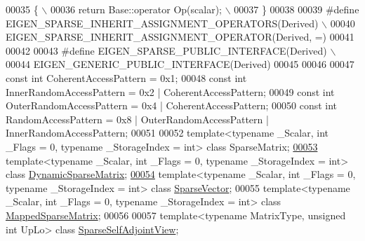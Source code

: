 \begin{DoxyCode}
00035 \textcolor{preprocessor}{\{ \(\backslash\)}
00036 \textcolor{preprocessor}{  return Base::operator Op(scalar); \(\backslash\)}
00037 \textcolor{preprocessor}{\}}
00038 
00039 \textcolor{preprocessor}{#define EIGEN\_SPARSE\_INHERIT\_ASSIGNMENT\_OPERATORS(Derived) \(\backslash\)}
00040 \textcolor{preprocessor}{EIGEN\_SPARSE\_INHERIT\_ASSIGNMENT\_OPERATOR(Derived, =)}
00041 
00042 
00043 \textcolor{preprocessor}{#define EIGEN\_SPARSE\_PUBLIC\_INTERFACE(Derived) \(\backslash\)}
00044 \textcolor{preprocessor}{  EIGEN\_GENERIC\_PUBLIC\_INTERFACE(Derived)}
00045 
00046   
00047 \textcolor{keyword}{const} \textcolor{keywordtype}{int} CoherentAccessPattern     = 0x1;
00048 \textcolor{keyword}{const} \textcolor{keywordtype}{int} InnerRandomAccessPattern  = 0x2 | CoherentAccessPattern;
00049 \textcolor{keyword}{const} \textcolor{keywordtype}{int} OuterRandomAccessPattern  = 0x4 | CoherentAccessPattern;
00050 \textcolor{keyword}{const} \textcolor{keywordtype}{int} RandomAccessPattern       = 0x8 | OuterRandomAccessPattern | InnerRandomAccessPattern;
00051 
00052 \textcolor{keyword}{template}<\textcolor{keyword}{typename} \_Scalar, \textcolor{keywordtype}{int} \_Flags = 0, \textcolor{keyword}{typename} \_StorageIndex = \textcolor{keywordtype}{int}>  \textcolor{keyword}{class }SparseMatrix;
\hyperlink{class_eigen_1_1_dynamic_sparse_matrix}{00053} \textcolor{keyword}{template}<\textcolor{keyword}{typename} \_Scalar, \textcolor{keywordtype}{int} \_Flags = 0, \textcolor{keyword}{typename} \_StorageIndex = \textcolor{keywordtype}{int}>  \textcolor{keyword}{class }
      \hyperlink{class_eigen_1_1_dynamic_sparse_matrix}{DynamicSparseMatrix};
\hyperlink{group___sparse_core___module}{00054} \textcolor{keyword}{template}<\textcolor{keyword}{typename} \_Scalar, \textcolor{keywordtype}{int} \_Flags = 0, \textcolor{keyword}{typename} \_StorageIndex = \textcolor{keywordtype}{int}>  \textcolor{keyword}{class }
      \hyperlink{group___sparse_core___module_class_eigen_1_1_sparse_vector}{SparseVector};
00055 \textcolor{keyword}{template}<\textcolor{keyword}{typename} \_Scalar, \textcolor{keywordtype}{int} \_Flags = 0, \textcolor{keyword}{typename} \_StorageIndex = \textcolor{keywordtype}{int}>  \textcolor{keyword}{class }
      \hyperlink{class_eigen_1_1_mapped_sparse_matrix}{MappedSparseMatrix};
00056 
00057 \textcolor{keyword}{template}<\textcolor{keyword}{typename} MatrixType, \textcolor{keywordtype}{unsigned} \textcolor{keywordtype}{int} UpLo>  \textcolor{keyword}{class }\hyperlink{group___sparse_core___module_class_eigen_1_1_sparse_self_adjoint_view}{SparseSelfAdjointView};

\end{DoxyCode}
